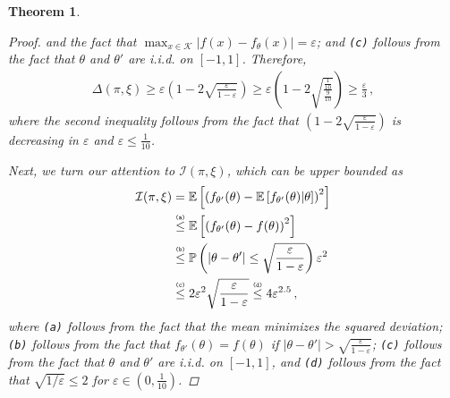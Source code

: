 \documentclass[letter, 12pt]{report}
\newcommand{\explan}[1]{\stackrel{\text{\tiny \texttt{#1}}}}
\newcommand{\paren}[1]{\left( #1 \right)}
\newcommand{\brak}[1]{\left[ #1 \right]}
\newcommand{\E}{\mathbb E}
\newcommand{\cK}{\mathcal K}
\newcommand{\I}{\mathcal{I}}
\newcommand{\1}{\mathbf{1}}
\renewcommand{\epsilon}{\varepsilon}
\theoremstyle{plain}
\newtheorem{theorem}{Theorem}
\theoremstyle{definition}
\theoremstyle{remark}
\begin{document}
\begin{theorem}
\begin{proof}
        and the fact that $\max_{x \in \cK} |f(x) - f_\theta(x)| = \epsilon$;
        and \texttt{(c)} follows from the fact that $\theta$ and $\theta'$ are i.i.d. on $[-1,1]$.
        Therefore,
        \begin{align}
            \Delta(\pi, \xi)
            \geq
            \epsilon \paren{1 - 2 \sqrt{\frac{\epsilon}{1-\epsilon}}}
            \geq
            \epsilon \paren{1 - 2 \sqrt{\frac{\tfrac{1}{10}}{\tfrac{9}{10}}}}
            \geq \frac{\epsilon}{3}
            \,,
            \label{eq:adv-D-lower}
        \end{align}
        where the second inequality follows from the fact that $\left(1 - 2 \sqrt{\frac{\epsilon}{1-\epsilon}}\right)$ is decreasing in $\epsilon$ and $\epsilon \leq \frac{1}{10}$.

        Next, we turn our attention to $\I(\pi, \xi)$, which can be upper bounded as
        \begin{align}
            \I(\pi, \xi)
             & =
            \E\brak{
                \paren{
                    f_{\theta'}(\theta) - \E\brak{f_{\theta'}(\theta)|\theta}
                }^2
            }
            \nonumber
            \\
             &
            \explan{(a)}
            \leq
            \E\brak{
                \paren{
                    f_{\theta'}(\theta) - f(\theta)
                }^2
            }
            \nonumber
            \\
             &
            \explan{(b)}
            \leq
            \mathbb{P}\paren{
                |\theta - \theta'| \leq \sqrt{\frac{\epsilon}{1-\epsilon}}
            }
            \epsilon^2
            \nonumber
            \\
             &
            \explan{(c)}
            \leq
            2 \epsilon^2\sqrt{\frac{\epsilon}{1-\epsilon}}
            \explan{(d)}
            \leq
            4 \epsilon^{2.5}\,,
            \label{eq:adv-I-upper}
        \end{align}
        where \texttt{(a)} follows from the fact that the mean minimizes the squared deviation;
        \texttt{(b)} follows from the fact that $f_{\theta'}(\theta) = f(\theta)$
        if $|\theta - \theta'| > \sqrt{\frac{\epsilon}{1-\epsilon}}$;
        \texttt{(c)} follows from the fact that $\theta$ and $\theta'$ are i.i.d. on $[-1,1]$,
        and \texttt{(d)} follows from the fact that $\sqrt{1/\epsilon} \leq 2$ for $\epsilon \in (0, \frac{1}{10})$.


\end{proof}
\end{theorem}
\end{document}
